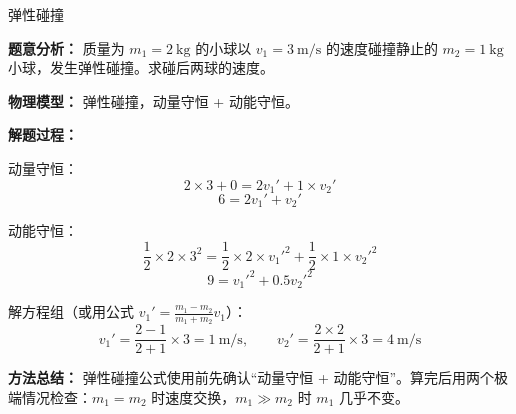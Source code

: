 \begin{examplebox}{弹性碰撞}

\textbf{题意分析：} 质量为 $m_1 = 2\ \mathrm{kg}$ 的小球以 $v_1 = 3\ \mathrm{m/s}$ 的速度碰撞静止的 $m_2 = 1\ \mathrm{kg}$ 小球，发生弹性碰撞。求碰后两球的速度。

\textbf{物理模型：} 弹性碰撞，动量守恒 + 动能守恒。

\textbf{解题过程：}

动量守恒：
\[
2 \times 3 + 0 = 2 v_1' + 1 \times v_2'
\]
\[
6 = 2 v_1' + v_2'
\]

动能守恒：
\[
\frac12 \times 2 \times 3^2 = \frac12 \times 2 \times v_1'^2 + \frac12 \times 1 \times v_2'^2
\]
\[
9 = v_1'^2 + 0.5 v_2'^2
\]

解方程组（或用公式 $v_1' = \frac{m_1-m_2}{m_1+m_2}v_1$）：
\[
v_1' = \frac{2-1}{2+1} \times 3 = 1\ \mathrm{m/s},\qquad
v_2' = \frac{2 \times 2}{2+1} \times 3 = 4\ \mathrm{m/s}
\]

\textbf{方法总结：} 弹性碰撞公式使用前先确认“动量守恒 + 动能守恒”。算完后用两个极端情况检查：$m_1=m_2$ 时速度交换，$m_1\gg m_2$ 时 $m_1$ 几乎不变。

\end{examplebox}

